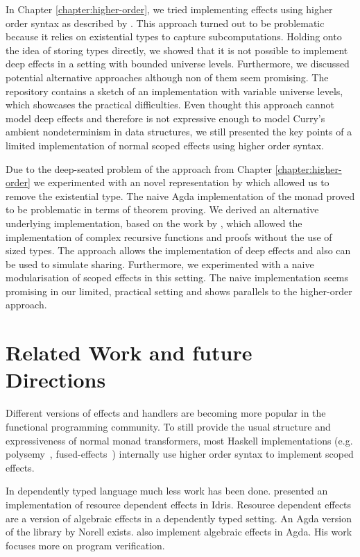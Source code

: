 \documentclass[10pt,a4paper,twoside,notitlepage]{report}
\begin{document}
In Chapter \ref{chapter:higher-order}, we tried implementing effects using higher
order syntax as described by \textcite{DBLP:conf/haskell/WuSH14}.
This approach turned out to be problematic because it relies on existential
types to capture subcomputations.
Holding onto the idea of storing types directly, we showed that it is not
possible to implement deep effects in a setting with bounded universe levels.
Furthermore, we discussed potential alternative approaches although non of them
seem promising.
The repository contains a sketch of an implementation with variable universe
levels, which showcases the practical difficulties.
Even thought this approach cannot model deep effects and therefore is not
expressive enough to model Curry's ambient nondeterminism in data structures, we
still presented the key points of a limited implementation of normal scoped
effects using higher order syntax.

Due to the deep-seated problem of the approach from Chapter
\ref{chapter:higher-order} we experimented with an novel representation by
\textcite{DBLP:conf/lics/PirogSWJ18} which allowed us to remove the existential
type.
The naive Agda implementation of the monad \textcite{DBLP:conf/lics/PirogSWJ18}
proved to be problematic in terms of theorem proving.
We derived an alternative underlying implementation, based on the work by
\textcite{DBLP:journals/corr/abs-1806-05230}, which allowed the implementation
of complex recursive functions and proofs without the use of sized types.
The approach allows the implementation of deep effects and also can be used to
simulate sharing.
Furthermore, we experimented with a naive modularisation of scoped effects in
this setting.
The naive implementation seems promising in our limited, practical
setting and shows parallels to the higher-order approach. %


\section{Related Work and future Directions}

Different versions of effects and handlers are becoming more popular in the
functional programming community.
To still provide the usual structure and expressiveness of normal monad
transformers, most Haskell implementations (e.g.
polysemy~\cite{SOFTWARE:polysemy}, fused-effects~\cite{SOFTWARE:fused-effects})
internally use higher order syntax to implement scoped effects.

In dependently typed language much less work has been done.
\textcite{DBLP:conf/icfp/Brady13} presented an implementation of resource
dependent effects in Idris.
Resource dependent effects are a version of algebraic effects in a dependently
typed setting.
An Agda version of the library by Norell exists.
\textcite{baanen2019algebraic} also implement algebraic effects in Agda.
His work focuses more on program verification.
\end{document}
